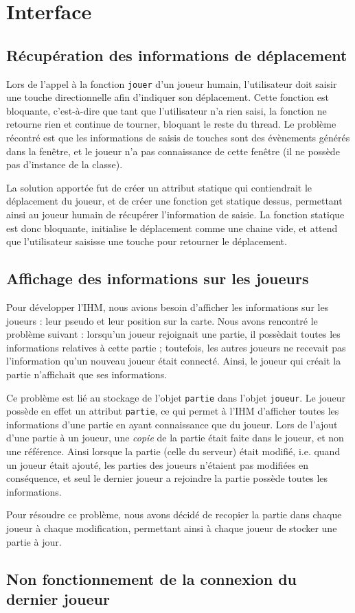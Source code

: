 
\section{Interface}
    \subsection{Récupération des informations de déplacement}
        Lors de l'appel à la fonction \verb|jouer| d'un joueur humain, l'utilisateur doit saisir une touche directionnelle afin d'indiquer son déplacement. Cette fonction est bloquante, c'est-à-dire que tant que l'utilisateur n'a rien saisi, la fonction ne retourne rien et continue de tourner, bloquant le reste du thread. Le problème récontré est que les informations de saisis de touches sont des évènements générés dans la fenêtre, et le joueur n'a pas connaissance de cette fenêtre (il ne possède pas d'instance de la classe).

        La solution apportée fut de créer un attribut statique qui contiendrait le déplacement du joueur, et de créer une fonction get statique dessus, permettant ainsi au joueur humain de récupérer l'information de saisie. La fonction statique est donc bloquante, initialise le déplacement comme une chaine vide, et attend que l'utilisateur saisisse une touche pour retourner le déplacement.

    \subsection{Affichage des informations sur les joueurs}
        Pour développer l'IHM, nous avions besoin d'afficher les informations sur les joueurs : leur pseudo et leur position sur la carte. Nous avons rencontré le problème suivant : lorsqu'un joueur rejoignait une partie, il possèdait toutes les informations relatives à cette partie ; toutefois, les autres joueurs ne recevait pas l'information qu'un nouveau joueur était connecté. Ainsi, le joueur qui créait la partie n'affichait que ses informations.

        Ce problème est lié au stockage de l'objet \verb|partie| dans l'objet \verb|joueur|. Le joueur possède en effet un attribut \verb|partie|, ce qui permet à l'IHM d'afficher toutes les informations d'une partie en ayant connaissance que du joueur. Lors de l'ajout d'une partie à un joueur, une \emph{copie} de la partie était faite dans le joueur, et non une référence. Ainsi lorsque la partie (celle du serveur) était modifié, i.e. quand un joueur était ajouté, les parties des joueurs n'étaient pas modifiées en conséquence, et seul le dernier joueur a rejoindre la partie possède toutes les informations.

        Pour résoudre ce problème, nous avons décidé de recopier la partie dans chaque joueur à chaque modification, permettant ainsi à chaque joueur de stocker une partie à jour.

    \subsection{Non fonctionnement de la connexion du dernier joueur}

